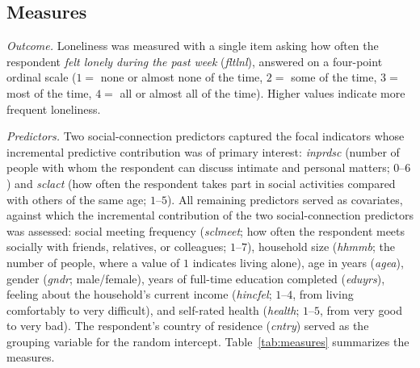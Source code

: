 \documentclass[12pt]{article}
\newcommand{\code}[1]{\textit{#1}}
\begin{document}
\subsection{Measures}

\textit{Outcome.} Loneliness was measured with a single item asking how often the respondent
\textit{felt lonely during the past week} (\code{fltlnl}), answered on a four-point ordinal
scale ($1 =$ none or almost none of the time, $2 =$ some of the time, $3 =$ most of the
time, $4 =$ all or almost all of the time). Higher values indicate more frequent loneliness.

\textit{Predictors.} Two social-connection predictors captured the focal indicators whose
incremental predictive contribution was of primary interest: \code{inprdsc} (number of people
with whom the respondent can discuss intimate and personal matters; $0$--$6$) and \code{sclact}
(how often the respondent takes part in social activities compared with others of the same age;
$1$--$5$). All remaining predictors served as covariates, against which the incremental
contribution of the two social-connection predictors was assessed: social meeting frequency
(\code{sclmeet}; how often the respondent meets socially with friends, relatives, or
colleagues; $1$--$7$), household size (\code{hhmmb}; the number of people, where a value of $1$ indicates living alone),
age in years (\code{agea}), gender (\code{gndr}; male/female), years of full-time education
completed (\code{eduyrs}), feeling about the household's current income (\code{hincfel};
$1$--$4$, from living comfortably to very difficult), and self-rated health (\code{health};
$1$--$5$, from very good to very bad). The respondent's country of residence (\code{cntry})
served as the grouping variable for the random intercept. Table~\ref{tab:measures} summarizes
the measures.
\end{document}
